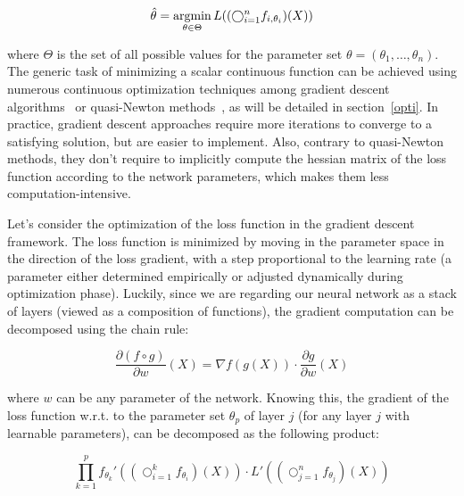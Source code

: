         \begin{equation}
            \hat{\theta} = \operatorname*{argmin}_{\theta \in \Theta} L((\bigcirc_{i=1}^{n} f_{i, \theta_i})(X))
        \end{equation}

        where $\Theta$ is the set of all possible values for the parameter set $\theta = (\theta_1, \ldots, \theta_n)$.
        The generic task of minimizing a scalar continuous function can be achieved
        using numerous continuous optimization techniques among gradient descent algorithms~\cite{DBLP:journals/corr/Ruder16}
        or quasi-Newton methods~\cite{LBFGS}, as will be detailed in section~\ref{opti}.
        In practice, gradient descent approaches require more iterations to converge to a satisfying solution,
        but are easier to implement. Also, contrary to quasi-Newton methods,
        they don't require to implicitly compute the hessian matrix of the loss
        function according to the network parameters, which makes them less computation-intensive.
        
        Let's consider the optimization of the loss function in the gradient descent framework.
        The loss function is minimized by moving in the parameter space in the direction of the loss gradient, with
        a step proportional to the learning rate (a parameter either determined empirically
        or adjusted dynamically during optimization phase).
        Luckily, since we are regarding our neural network as a stack of layers
        (viewed as a composition of functions), the gradient computation can be decomposed using the chain rule:

        \begin{equation} \label{eq:backprop}
            \frac{\partial (f \circ g)}{\partial w}(X) = \nabla f(g(X)) \cdot \frac{\partial g}{\partial w}(X)
        \end{equation}

        where $w$ can be any parameter of the network.
        Knowing this, the gradient of the loss function w.r.t. to the parameter set $\theta_p$
        of layer $j$ (for any layer $j$ with learnable parameters),
        can be decomposed as the following product:

        \begin{equation} \label{eq:loss}
            \prod_{k=1}^p f_{\theta_k}'\left((\bigcirc_{i=1}^{k} f_{\theta_i})(X)\right) \cdot L'\left((\bigcirc_{j=1}^{n} f_{\theta_j})(X)\right)
        \end{equation}  %

